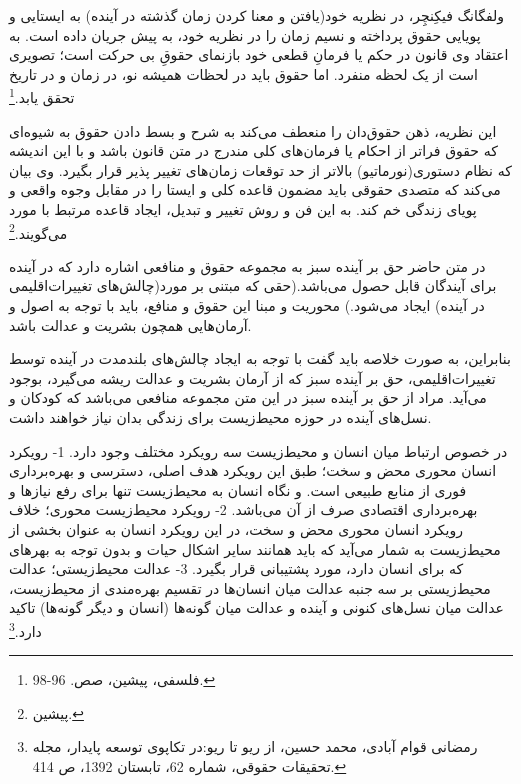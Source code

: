 ولفگانگ فیکِنچِر، در نظریه خود(یافتن و معنا کردن زمان گذشته در آینده) به ایستایی و پویایی حقوق پرداخته و نسیم زمان را در نظریه خود، به پیش جریان داده است. به اعتقاد وی قانون در حکم یا فرمانِ قطعی خود بازنمای حقوقِ بی حرکت است؛ تصویری است از یک لحظه منفرد. اما حقوق باید در لحظات همیشه نو، در زمان و در تاریخ تحقق یابد.\footnote{فلسفی، پیشین، صص. 96-98.}

این نظریه، ذهن حقوق‌دان را منعطف می‌کند به شرح و بسط دادن حقوق به شیوه‌ای که حقوق فراتر از احکام یا فرمان‌های کلی مندرج در متن قانون باشد و با این اندیشه که نظام دستوری(نورماتیو) بالاتر از حد توقعات زمان‌های تغییر پذیر قرار بگیرد. وی بیان می‌کند که متصدی حقوقی باید مضمون قاعده کلی و ایستا را در مقابل وجوه واقعی و پویای زندگی خم کند. به این فن و روش تغییر و تبدیل، ایجاد قاعده مرتبط با مورد می‌گویند.\footnote{پیشین.}


در متن حاضر حق بر آینده سبز به مجموعه حقوق و منافعی اشاره دارد که در آینده برای آیندگان قابل حصول می‌باشد.(حقی که مبتنی بر مورد(چالش‌های تغییرات‌اقلیمی در آینده) ایجاد می‌شود.) محوریت و مبنا این حقوق و منافع، باید با توجه به اصول و آرمان‌هایی  همچون بشریت و عدالت ‌باشد.  %

بنابراین، به صورت خلاصه باید گفت با توجه به ایجاد چالش‌های بلند‌مدت در آینده توسط تغییرات‌اقلیمی، حق بر آینده سبز که از آرمان بشریت و عدالت ریشه می‌گیرد، بوجود می‌آید. 
مراد از حق بر آینده سبز در این متن مجموعه منافعی می‌باشد که کودکان و نسل‌های آینده در حوزه  محیط‌زیست برای زندگی بدان نیاز خواهند داشت. 





در خصوص ارتباط میان انسان و  محیط‌زیست سه رویکرد مختلف وجود دارد. 1- رویکرد انسان محوری محض و سخت؛ طبق این رویکرد هدف اصلی، دسترسی و بهره‌برداری فوری از منابع طبیعی است. و نگاه انسان به  محیط‌زیست  تنها برای رفع نیاز‌ها و بهره‌برداری اقتصادی صرف از آن می‌باشد. 2- رویکرد  محیط‌زیست محوری؛ خلاف رویکرد انسان محوری محض و سخت، در این رویکرد انسان به عنوان بخشی از  محیط‌زیست به شمار می‌آید که باید همانند سایر اشکال حیات و بدون توجه به بهرهای که برای انسان دارد، مورد پشتیبانی قرار بگیرد. 3- عدالت محیط‌زیستی؛ عدالت محیط‌زیستی بر سه جنبه عدالت میان انسان‌ها در تقسیم بهره‌مندی از  محیط‌زیست، عدالت میان نسل‌های کنونی و آینده و عدالت میان گونه‌ها (انسان و دیگر گونه‌ها) تاکید دارد.\footnote{رمضانی قوام آبادی، محمد حسین، از ریو تا ریو:در تکاپوی توسعه پایدار، مجله تحقیقات حقوقی، شماره 62، تابستان 1392، ص 414.}  
	
